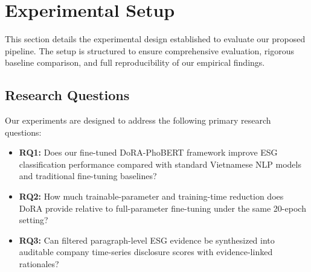 \documentclass{article}
\theoremstyle{plain}
\theoremstyle{definition}
\theoremstyle{remark}
\begin{document}



\section{Experimental Setup}
\label{sec:experimental_setup}

This section details the experimental design established to evaluate our proposed pipeline. The setup is structured to ensure comprehensive evaluation, rigorous baseline comparison, and full reproducibility of our empirical findings.

\subsection{Research Questions}
Our experiments are designed to address the following primary research questions:
\begin{itemize}
    \item \textbf{RQ1:} Does our fine-tuned DoRA-PhoBERT framework improve ESG classification performance compared with standard Vietnamese NLP models and traditional fine-tuning baselines?
    \item \textbf{RQ2:} How much trainable-parameter and training-time reduction does DoRA provide relative to full-parameter fine-tuning under the same 20-epoch setting?
    \item \textbf{RQ3:} Can filtered paragraph-level ESG evidence be synthesized into auditable company time-series disclosure scores with evidence-linked rationales?
\end{itemize}
\end{document}
